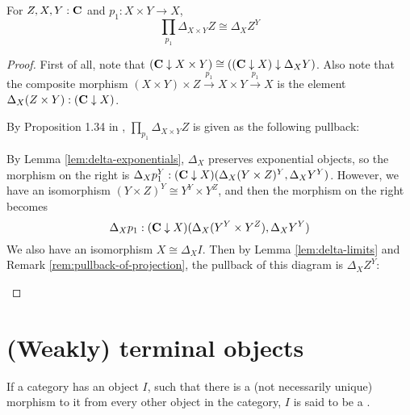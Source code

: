 \begin{lemma}\label{lem:constant-dependent-product}
  For $ Z, X, Y : \mathbf{C} $ and $ p_1 : X \times Y \to X $,
  \[ \prod_{p_1} \Delta_{X \times Y} Z \cong \Delta_X Z^Y \]
\end{lemma}
\begin{proof}
  First of all, note that $ (\mathbf{C} \downarrow X \times Y) \cong ((\mathbf{C} \downarrow X) \downarrow \Delta_X Y) $. Also note that the composite morphism $ (X \times Y) \times Z \xrightarrow{p_1} X \times Y \xrightarrow{p_1} X $ is the element $ \Delta_X (Z \times Y) : (\mathbf{C} \downarrow X) $.

  By Proposition 1.34 in \autocite{freyd}, $ \prod_{p_1} \Delta_{X \times Y} Z $ is given as the following pullback:
  \begin{center}
  \end{center}

  By Lemma \ref{lem:delta-exponentials}, $ \Delta_X $ preserves exponential objects, so the morphism on the right is $ \Delta_X p_1^Y : (\mathbf{C} \downarrow X)(\Delta_X (Y \times Z)^Y, \Delta_X Y^Y) $. However, we have an isomorphism $ (Y \times Z)^Y \cong Y^Y \times Y^Z $, and then the morphism on the right becomes
  \[ \Delta_X p_1 : (\mathbf{C} \downarrow X)(\Delta_X(Y^Y \times Y^Z), \Delta_X Y^Y) \]
  We also have an isomorphism $ X \cong \Delta_X I $. Then by Lemma \ref{lem:delta-limits} and Remark \ref{rem:pullback-of-projection}, the pullback of this diagram is $ \Delta_X Z^Y $:
  \begin{center}
  \end{center}
\end{proof}


\section{(Weakly) terminal objects}
\begin{definition}
  If a category has an object $ I $, such that there is a (not necessarily unique) morphism to it from every other object in the category, $ I $ is said to be a .
\end{definition}

